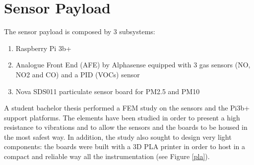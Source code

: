 \chapter{Sensor Payload}
The sensor payload is composed by 3 subsystems:
\begin{enumerate}
    \item Raspberry Pi 3b+
    \item Analogue Front End (AFE) by Alphasense equipped with 3 gas sensors (NO, NO2 and CO) and a PID (VOCs) sensor
    \item Nova SDS011 particulate sensor board for PM2.5 and PM10
\end{enumerate}
A student bachelor thesis performed a FEM study on the sensors and the Pi3b+ support platforms. The
elements have been studied in order to present a high resistance to vibrations and to allow the sensors
and the boards to be housed in the most safest way. In addition, the study also sought to design very
light components: the boards were built with a 3D PLA printer in order to host in a compact and
reliable way all the instrumentation (see Figure \ref{pla}).

